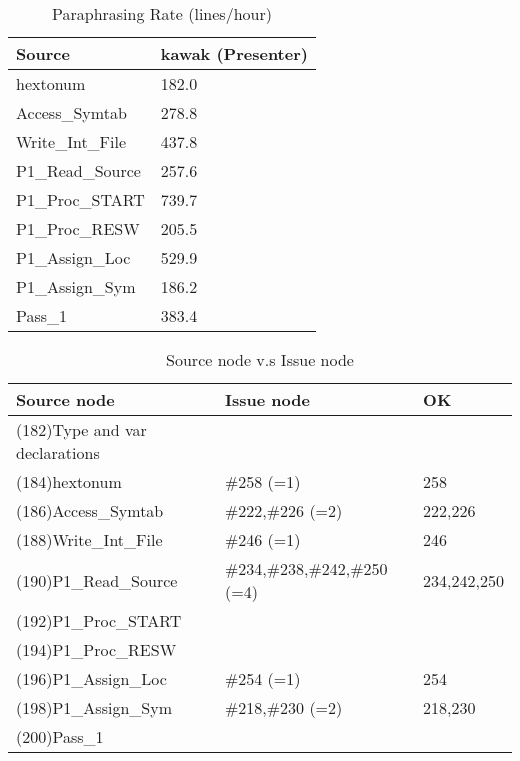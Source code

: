 \begin{table}[hb]
\begin{center}
\begin{tabular}{|l|l|}
\hline
Source & kawak (Presenter)\\
\hline
hextonum & 182.0\\
Access\_Symtab & 278.8\\
Write\_Int\_File & 437.8\\
P1\_Read\_Source & 257.6\\
P1\_Proc\_START & 739.7\\
P1\_Proc\_RESW & 205.5\\
P1\_Assign\_Loc & 529.9\\
P1\_Assign\_Sym & 186.2\\
Pass\_1 & 383.4\\
\hline
\end{tabular}
\end{center}
\caption{Paraphrasing Rate (lines/hour)}
\end{table}


\begin{table}[hb]
\begin{center}
\begin{tabular}{|l|l|l|}
\hline
Source node & Issue node  & OK \\
\hline
(182)Type and var declarations &  & \\
(184)hextonum & \#258 (=1) & 258\\
(186)Access\_Symtab & \#222,\#226 (=2) & 222,226\\
(188)Write\_Int\_File & \#246 (=1) & 246\\
(190)P1\_Read\_Source & \#234,\#238,\#242,\#250 (=4) & 234,242,250 \\
(192)P1\_Proc\_START &  & \\
(194)P1\_Proc\_RESW &  & \\
(196)P1\_Assign\_Loc & \#254 (=1) & 254\\
(198)P1\_Assign\_Sym & \#218,\#230 (=2) & 218,230\\
(200)Pass\_1 &  & \\
\hline
\end{tabular}
\caption{Source node v.s Issue node}
\end{center}
\end{table}

